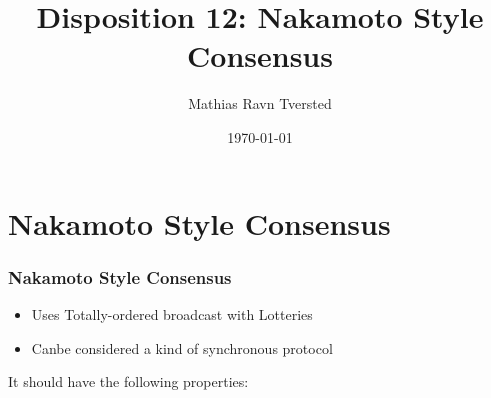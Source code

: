
\title{Disposition 12: Nakamoto Style Consensus}   
\author{Mathias Ravn Tversted} 
\date{\today} 




\frame{\titlepage} 









\section{Nakamoto Style Consensus}
    \begin{frame}
        \frametitle{Nakamoto Style Consensus}
           \begin{itemize}
              \item Uses Totally-ordered broadcast with Lotteries
              \item Canbe considered a kind of synchronous protocol
           \end{itemize} 
           It should have the following properties:
    \end{frame}

